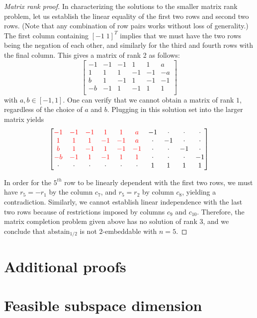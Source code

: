 \documentclass[anon]{colt2020} %
\newcommand{\abstain}[1]{\mathrm{abstain}_{#1}}
\begin{document}
\begin{proof}[Matrix rank proof]
  In characterizing the solutions to the smaller matrix rank problem, let us establish the linear equality of the first two rows and second two rows.
  (Note that any combination of row pairs works without loss of generality.)
  The first column containing $[-1 \; 1]^T$ implies that we must have the two rows being the negation of each other, and similarly for the third and fourth rows with the final column.
  This gives a matrix of rank 2 as follows:
  \[
    \begin{bmatrix}
  -1 & -1 & -1 & 1 & 1 & a \\
  1 & 1 & 1 & -1 & -1 & -a \\
  b & 1 & -1 & 1 & -1 & -1 \\
  -b & -1 & 1 & -1 & 1 & 1 \\
  \end{bmatrix}
  \] with $a, b \in [-1,1]$.
  One can verify that we cannot obtain a matrix of rank $1$, regardless of the choice of $a$ and $b$.
  Plugging in this solution set into the larger matrix yields
  \[
  \begin{bmatrix}
  {\color{red} -1} & {\color{red} -1} & {\color{red} -1} & {\color{red} 1} & {\color{red} 1} & {\color{red} a} & -1 & \cdot & \cdot & \cdot \\
  {\color{red} 1} & {\color{red} 1} & {\color{red} 1} & {\color{red} -1} & {\color{red} -1} & {\color{red} a} & \cdot & -1 & \cdot & \cdot \\
  {\color{red} b} & {\color{red} 1} & {\color{red} -1} & {\color{red} 1} & {\color{red} -1} & {\color{red} -1} & \cdot & \cdot & -1 & \cdot \\
  {\color{red} -b} & {\color{red} -1} & {\color{red} 1} & {\color{red} -1} & {\color{red} 1} & {\color{red} 1} & \cdot & \cdot & \cdot & -1 \\
  \cdot & \cdot & \cdot & \cdot & \cdot & \cdot & 1 & 1 & 1 & 1\\
  \end{bmatrix}
  \]
  
  In order for the $5^{th}$ row to be linearly dependent with the first two rows, we must have $r_5 = -r_1$ by the column $c_7$, and $r_5 = r_2$ by column $c_8$, yielding a contradiction.
  Similarly, we cannot establish linear independence with the last two rows because of restrictions imposed by columns $c_9$ and $c_{10}$.
  Therefore, the matrix completion problem given above has no solution of rank 3, and we conclude that $\abstain{1/2}$ is not $2$-embeddable with $n=5$.
\end{proof}


\newpage



\newpage
\appendix

\section{Additional proofs}


\section{Feasible subspace dimension}
\end{document}
